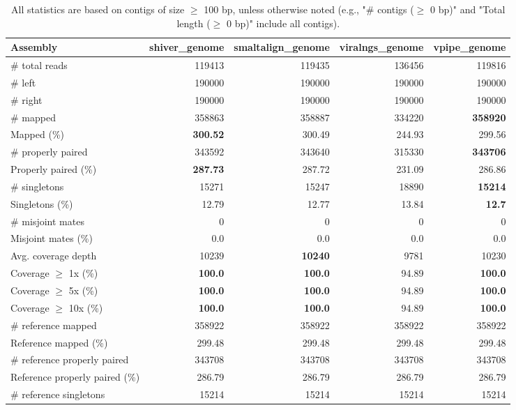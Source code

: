 \documentclass[12pt,a4paper]{article}
\begin{document}
\begin{table}[ht]
\begin{center}
\caption{All statistics are based on contigs of size $\geq$ 100 bp, unless otherwise noted (e.g., "\# contigs ($\geq$ 0 bp)" and "Total length ($\geq$ 0 bp)" include all contigs).}
\begin{tabular}{|l*{4}{|r}|}
\hline
Assembly & shiver\_genome & smaltalign\_genome & viralngs\_genome & vpipe\_genome \\ \hline
\# total reads & 119413 & 119435 & 136456 & 119816 \\ \hline
\# left & 190000 & 190000 & 190000 & 190000 \\ \hline
\# right & 190000 & 190000 & 190000 & 190000 \\ \hline
\# mapped & 358863 & 358887 & 334220 & {\bf 358920} \\ \hline
Mapped (\%) & {\bf 300.52} & 300.49 & 244.93 & 299.56 \\ \hline
\# properly paired & 343592 & 343640 & 315330 & {\bf 343706} \\ \hline
Properly paired (\%) & {\bf 287.73} & 287.72 & 231.09 & 286.86 \\ \hline
\# singletons & 15271 & 15247 & 18890 & {\bf 15214} \\ \hline
Singletons (\%) & 12.79 & 12.77 & 13.84 & {\bf 12.7} \\ \hline
\# misjoint mates & 0 & 0 & 0 & 0 \\ \hline
Misjoint mates (\%) & 0.0 & 0.0 & 0.0 & 0.0 \\ \hline
Avg. coverage depth & 10239 & {\bf 10240} & 9781 & 10230 \\ \hline
Coverage $\geq$ 1x (\%) & {\bf 100.0} & {\bf 100.0} & 94.89 & {\bf 100.0} \\ \hline
Coverage $\geq$ 5x (\%) & {\bf 100.0} & {\bf 100.0} & 94.89 & {\bf 100.0} \\ \hline
Coverage $\geq$ 10x (\%) & {\bf 100.0} & {\bf 100.0} & 94.89 & {\bf 100.0} \\ \hline
\# reference mapped & 358922 & 358922 & 358922 & 358922 \\ \hline
Reference mapped (\%) & 299.48 & 299.48 & 299.48 & 299.48 \\ \hline
\# reference properly paired & 343708 & 343708 & 343708 & 343708 \\ \hline
Reference properly paired (\%) & 286.79 & 286.79 & 286.79 & 286.79 \\ \hline
\# reference singletons & 15214 & 15214 & 15214 & 15214 \\ \hline

\end{tabular}
\end{center}
\end{table}
\end{document}
